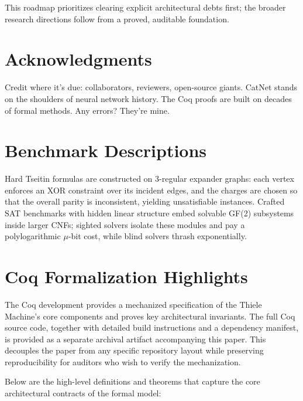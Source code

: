 \documentclass[11pt]{article}
\begin{document}
This roadmap prioritizes clearing explicit architectural debts first; the broader research directions follow from a proved, auditable foundation.

\section*{Acknowledgments}
Credit where it’s due: collaborators, reviewers, open-source giants. CatNet stands on the shoulders of neural network history. The Coq proofs are built on decades of formal methods. Any errors? They’re mine.

\appendix

\section{Benchmark Descriptions}\label{appendix:benchmarks}
Hard Tseitin formulas are constructed on 3-regular expander graphs: each vertex enforces an XOR constraint over its incident edges, and the charges are chosen so that the overall parity is inconsistent, yielding unsatisfiable instances. Crafted SAT benchmarks with hidden linear structure embed solvable GF(2) subsystems inside larger CNFs; sighted solvers isolate these modules and pay a polylogarithmic $\mu$-bit cost, while blind solvers thrash exponentially.

\section{Coq Formalization Highlights}\label{appendix:coq}

The Coq development provides a mechanized specification of the Thiele Machine's core components and proves key architectural invariants. The full Coq source code, together with detailed build instructions and a dependency manifest, is provided as a separate archival artifact accompanying this paper. This decouples the paper from any specific repository layout while preserving reproducibility for auditors who wish to verify the mechanization.

Below are the high-level definitions and theorems that capture the core architectural contracts of the formal model:
\end{document}
